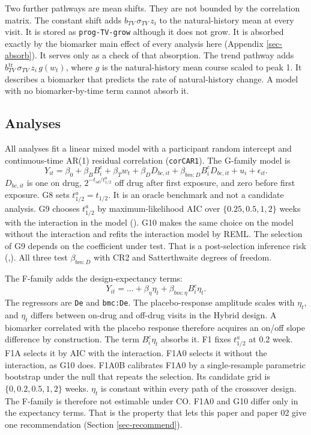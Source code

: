 \documentclass[
  11pt,
]{article}
\begin{document}
Two further pathways are mean shifts. They are not bounded by the
correlation matrix. The constant shift adds \(b_{TV}\,\sigma_{TV}\,z_i\)
to the natural-history mean at every visit. It is stored as
\texttt{prog-TV-grow} although it does not grow. It is absorbed exactly by
the biomarker main effect of every analysis here (Appendix
\ref{sec-absorb}). It serves only as a check of that absorption. The
trend pathway adds \(b_{TV}^{\mathrm{tr}}\,\sigma_{TV}\,z_i\,g(w_t)\),
where \(g\) is the natural-history mean course scaled to peak 1. It
describes a biomarker that predicts the rate of natural-history
change. A model with no biomarker-by-time term cannot absorb it.

\subsection{Analyses}\label{sec-analyses}

All analyses fit a linear mixed model with a participant random
intercept and continuous-time AR(1) residual correlation
(\texttt{corCAR1}). The G-family model is
\[Y_{it} = \beta_0 + \beta_B B^c_i + \beta_T w_t + \beta_D D_{bc,it}
  + \beta_{bm:D} B^c_i D_{bc,it} + u_i + \epsilon_{it}.\]
\(D_{bc,it}\) is one on drug, \(2^{-t_{sd}/t^a_{1/2}}\) off drug after
first exposure, and zero before first exposure. G8 sets
\(t^a_{1/2} = t_{1/2}\). It is an oracle benchmark and not a candidate
analysis. G9 chooses \(t^a_{1/2}\) by maximum-likelihood AIC over
\(\{0.25, 0.5, 1, 2\}\) weeks with the interaction in the model
(). G10 makes the same choice on the model without the
interaction and refits the interaction model by REML. The selection
of G9 depends on the coefficient under test. That is a
post-selection inference risk (,). All three
test \(\beta_{bm:D}\) with CR2 and Satterthwaite degrees of freedom.

The F-family adds the design-expectancy terms:
\[Y_{it} = \ldots + \beta_\eta \eta_t + \beta_{bm:\eta} B^c_i \eta_t.\]
The regressors are \texttt{De} and \texttt{bmc:De}. The placebo-response amplitude
scales with \(\eta_t\), and \(\eta_t\) differs between on-drug and
off-drug visits in the Hybrid design. A biomarker correlated with the
placebo response therefore acquires an on/off slope difference by
construction. The term \(B^c_i\eta_t\) absorbs it. F1 fixes
\(t^a_{1/2}\) at 0.2 week. F1A selects it by AIC with the interaction.
F1A0 selects it without the interaction, as G10 does. F1A0B
calibrates F1A0 by a single-resample parametric bootstrap under the
null that repeats the selection. Its candidate grid is \(\{0, 0.2,
0.5, 1, 2\}\) weeks. \(\eta_t\) is constant within every path of the
crossover design. The F-family is therefore not estimable under CO.
F1A0 and G10 differ only in the expectancy terms. That is the
property that lets this paper and paper 02 give one recommendation
(Section \ref{sec-recommend}).
\end{document}
